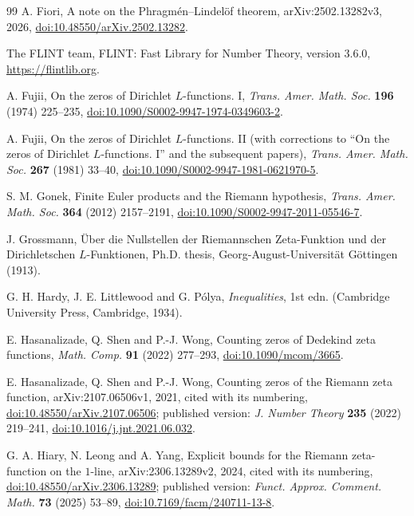 \documentclass[11pt,a4paper]{article}
\numberwithin{equation}{section}
\theoremstyle{definition}
\theoremstyle{remark}
\begin{document}
\begin{thebibliography}{99}
 A. Fiori, A note on the Phragm\'en--Lindel\"of theorem, arXiv:2502.13282v3, 2026, \href{https://doi.org/10.48550/arXiv.2502.13282}{doi:10.48550/arXiv.2502.13282}.

 The FLINT team, FLINT: Fast Library for Number Theory, version 3.6.0, \url{https://flintlib.org}.

 A. Fujii, On the zeros of Dirichlet $L$-functions. I, \textit{Trans. Amer. Math. Soc.} \textbf{196} (1974) 225--235, \href{https://doi.org/10.1090/S0002-9947-1974-0349603-2}{doi:10.1090/S0002-9947-1974-0349603-2}.

 A. Fujii, On the zeros of Dirichlet $L$-functions. II (with corrections to ``On the zeros of Dirichlet $L$-functions. I'' and the subsequent papers), \textit{Trans. Amer. Math. Soc.} \textbf{267} (1981) 33--40, \href{https://doi.org/10.1090/S0002-9947-1981-0621970-5}{doi:10.1090/S0002-9947-1981-0621970-5}.

 S. M. Gonek, Finite Euler products and the Riemann hypothesis, \textit{Trans. Amer. Math. Soc.} \textbf{364} (2012) 2157--2191, \href{https://doi.org/10.1090/S0002-9947-2011-05546-7}{doi:10.1090/S0002-9947-2011-05546-7}.

 J. Grossmann, \"Uber die Nullstellen der Riemannschen Zeta-Funktion und der Dirichletschen $L$-Funktionen, Ph.D. thesis, Georg-August-Universit\"at G\"ottingen (1913).

 G. H. Hardy, J. E. Littlewood and G. P\'olya, \textit{Inequalities}, 1st edn. (Cambridge University Press, Cambridge, 1934).

 E. Hasanalizade, Q. Shen and P.-J. Wong, Counting zeros of Dedekind zeta functions, \textit{Math. Comp.} \textbf{91} (2022) 277--293, \href{https://doi.org/10.1090/mcom/3665}{doi:10.1090/mcom/3665}.

 E. Hasanalizade, Q. Shen and P.-J. Wong, Counting zeros of the Riemann zeta function, arXiv:2107.06506v1, 2021, cited with its numbering, \href{https://doi.org/10.48550/arXiv.2107.06506}{doi:10.48550/arXiv.2107.06506}; published version: \textit{J. Number Theory} \textbf{235} (2022) 219--241, \href{https://doi.org/10.1016/j.jnt.2021.06.032}{doi:10.1016/j.jnt.2021.06.032}.

 G. A. Hiary, N. Leong and A. Yang, Explicit bounds for the Riemann zeta-function on the $1$-line, arXiv:2306.13289v2, 2024, cited with its numbering, \href{https://doi.org/10.48550/arXiv.2306.13289}{doi:10.48550/arXiv.2306.13289}; published version: \textit{Funct. Approx. Comment. Math.} \textbf{73} (2025) 53--89, \href{https://doi.org/10.7169/facm/240711-13-8}{doi:10.7169/facm/240711-13-8}.


\end{thebibliography}
\end{document}
